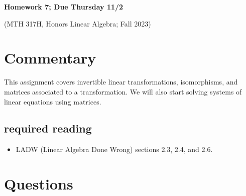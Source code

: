 \documentclass[12pt]{article}
\begin{document}
	\begin{LARGE}
	\begin{center}
		
		

		
	
	\textbf{Homework 7; Due Thursday 11/2}
	

	(MTH 317H, Honors Linear Algebra;  Fall 2023)
	\end{center}
	\end{LARGE}
	\vspace{0.15in}
	
	
	

\section{Commentary}

This assignment covers invertible linear transformations, isomorphisms, and matrices associated to a transformation. We will also start solving systems of linear equations using matrices. 

\subsection{required reading}

\begin{itemize}
	\item LADW (Linear Algebra Done Wrong) sections 2.3, 2.4, and 2.6.
\end{itemize}




\section{Questions}
\end{document}
